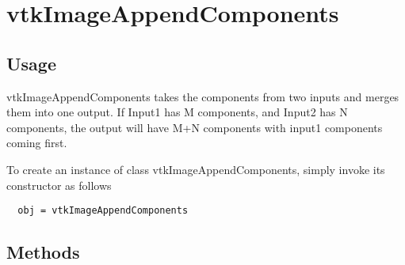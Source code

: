 \section{vtkImageAppendComponents}

\subsection{Usage}

 vtkImageAppendComponents takes the components from two inputs and merges
 them into one output. If Input1 has M components, and Input2 has N 
 components, the output will have M+N components with input1
 components coming first.

To create an instance of class vtkImageAppendComponents, simply
invoke its constructor as follows
\begin{verbatim}
  obj = vtkImageAppendComponents
\end{verbatim}
\subsection{Methods}


